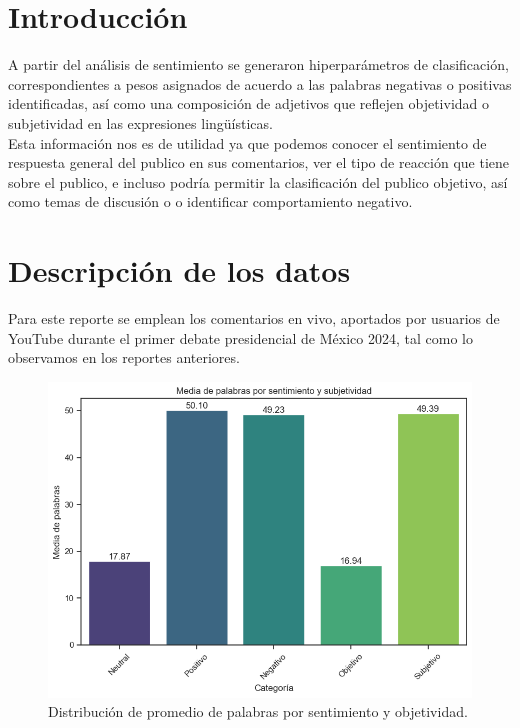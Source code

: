 \chapter{Introducción}

A partir del análisis de sentimiento se generaron hiperparámetros de clasificación, correspondientes a pesos asignados de acuerdo a las palabras negativas o positivas identificadas, así como una composición de adjetivos que reflejen objetividad o subjetividad en las expresiones lingüísticas.\\

Esta información nos es de utilidad ya que podemos conocer el sentimiento de respuesta general del publico en sus comentarios, ver el tipo de reacción que tiene sobre el publico, e incluso podría permitir la clasificación del publico objetivo, así como temas de discusión o o identificar comportamiento negativo.\\

\chapter{Descripción de los datos}

Para este reporte se emplean los comentarios en vivo, aportados por usuarios de YouTube durante el primer debate presidencial de México 2024, tal como lo observamos en los reportes anteriores.\\

\begin{figure}[!h]
	\centering
	\includegraphics[width=14cm]{Images/Promedio_de_palabras}
	\caption{Distribución de promedio de palabras por sentimiento y objetividad.}
	\label{fig:promediodepalabras}
\end{figure}


